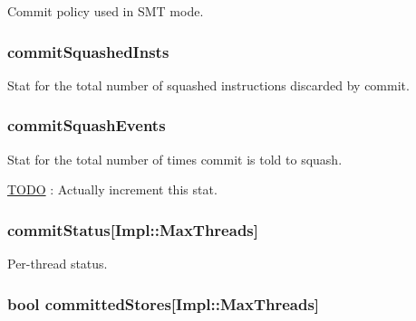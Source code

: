 \label{classDefaultCommit_acbc18713699043ca78415e9f03712ce1}
Commit policy used in SMT mode. \hypertarget{classDefaultCommit_a66220ac67b22e3faf86b642ecc217546}{
\subsubsection[{commitSquashedInsts}]{ {\bf commitSquashedInsts}}}
\label{classDefaultCommit_a66220ac67b22e3faf86b642ecc217546}
Stat for the total number of squashed instructions discarded by commit. \hypertarget{classDefaultCommit_a89ef54d73dbded95395181561013b0b6}{
\subsubsection[{commitSquashEvents}]{ {\bf commitSquashEvents}}}
\label{classDefaultCommit_a89ef54d73dbded95395181561013b0b6}
Stat for the total number of times commit is told to squash. \begin{Desc}
\item[\hyperlink{todo__todo000026}{TODO}]: Actually increment this stat. \end{Desc}
\hypertarget{classDefaultCommit_ae7adb1afa143087a1e39aa65f3921185}{
\subsubsection[{commitStatus}]{ {\bf commitStatus}\mbox{[}Impl::MaxThreads\mbox{]}}}
\label{classDefaultCommit_ae7adb1afa143087a1e39aa65f3921185}
Per-\/thread status. \hypertarget{classDefaultCommit_a0fd9fcb6eed99c11c7fa61c7218ecf49}{
\subsubsection[{committedStores}]{\setlength{\rightskip}{0pt plus 5cm}bool {\bf committedStores}\mbox{[}Impl::MaxThreads\mbox{]}}}
